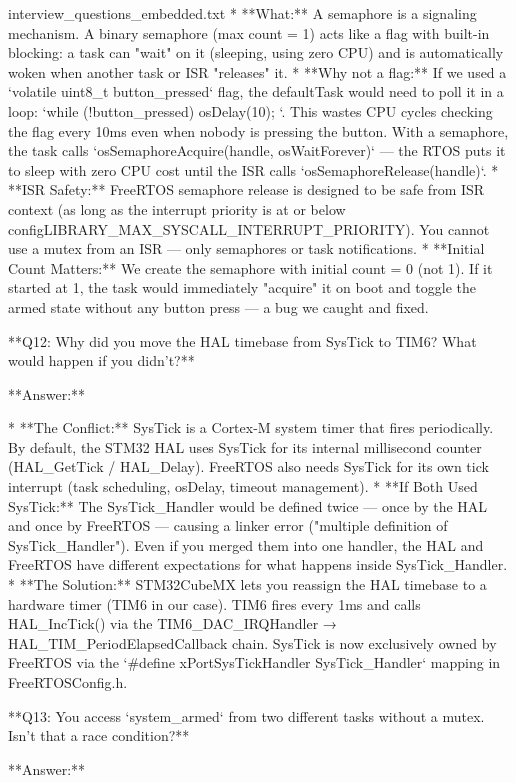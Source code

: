 \begin{filecontents*}{interview_questions_embedded.txt}
* **What:** A semaphore is a signaling mechanism. A binary semaphore (max count = 1) acts like a flag with built-in blocking: a task can "wait" on it (sleeping, using zero CPU) and is automatically woken when another task or ISR "releases" it.
* **Why not a flag:** If we used a `volatile uint8_t button_pressed` flag, the defaultTask would need to poll it in a loop: `while (!button_pressed) { osDelay(10); }`. This wastes CPU cycles checking the flag every 10ms even when nobody is pressing the button. With a semaphore, the task calls `osSemaphoreAcquire(handle, osWaitForever)` — the RTOS puts it to sleep with zero CPU cost until the ISR calls `osSemaphoreRelease(handle)`.
* **ISR Safety:** FreeRTOS semaphore release is designed to be safe from ISR context (as long as the interrupt priority is at or below configLIBRARY_MAX_SYSCALL_INTERRUPT_PRIORITY). You cannot use a mutex from an ISR — only semaphores or task notifications.
* **Initial Count Matters:** We create the semaphore with initial count = 0 (not 1). If it started at 1, the task would immediately "acquire" it on boot and toggle the armed state without any button press — a bug we caught and fixed.

**Q12: Why did you move the HAL timebase from SysTick to TIM6? What would happen if you didn't?**

**Answer:**

* **The Conflict:** SysTick is a Cortex-M system timer that fires periodically. By default, the STM32 HAL uses SysTick for its internal millisecond counter (HAL_GetTick / HAL_Delay). FreeRTOS also needs SysTick for its own tick interrupt (task scheduling, osDelay, timeout management).
* **If Both Used SysTick:** The SysTick_Handler would be defined twice — once by the HAL and once by FreeRTOS — causing a linker error ("multiple definition of SysTick_Handler"). Even if you merged them into one handler, the HAL and FreeRTOS have different expectations for what happens inside SysTick_Handler.
* **The Solution:** STM32CubeMX lets you reassign the HAL timebase to a hardware timer (TIM6 in our case). TIM6 fires every 1ms and calls HAL_IncTick() via the TIM6_DAC_IRQHandler → HAL_TIM_PeriodElapsedCallback chain. SysTick is now exclusively owned by FreeRTOS via the `#define xPortSysTickHandler SysTick_Handler` mapping in FreeRTOSConfig.h.

**Q13: You access `system_armed` from two different tasks without a mutex. Isn't that a race condition?**

**Answer:**


\end{filecontents*}
